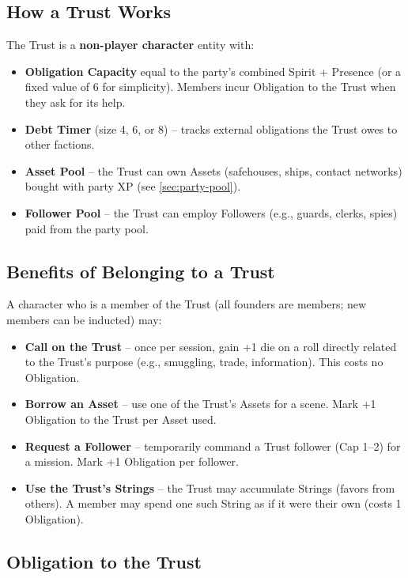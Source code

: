 \subsection{How a Trust Works}
\label{subsec:trust-mechanics}

The Trust is a \textbf{non-player character} entity with:

\begin{itemize}
  \item \textbf{Obligation Capacity} equal to the party's combined Spirit + Presence (or a fixed value of 6 for simplicity). Members incur Obligation to the Trust when they ask for its help.
  \item \textbf{Debt Timer} (size 4, 6, or 8) -- tracks external obligations the Trust owes to other factions.
  \item \textbf{Asset Pool} -- the Trust can own Assets (safehouses, ships, contact networks) bought with party XP (see \ref{sec:party-pool}).
  \item \textbf{Follower Pool} -- the Trust can employ Followers (e.g., guards, clerks, spies) paid from the party pool.
\end{itemize}

\subsection{Benefits of Belonging to a Trust}
\label{subsec:trust-benefits}

A character who is a member of the Trust (all founders are members; new members can be inducted) may:

\begin{itemize}
  \item \textbf{Call on the Trust} -- once per session, gain +1 die on a roll directly related to the Trust's purpose (e.g., smuggling, trade, information). This costs no Obligation.
  \item \textbf{Borrow an Asset} -- use one of the Trust's Assets for a scene. Mark +1 Obligation to the Trust per Asset used.
  \item \textbf{Request a Follower} -- temporarily command a Trust follower (Cap 1--2) for a mission. Mark +1 Obligation per follower.
  \item \textbf{Use the Trust's Strings} -- the Trust may accumulate Strings (favors from others). A member may spend one such String as if it were their own (costs 1 Obligation).
\end{itemize}

\subsection{Obligation to the Trust}
\label{subsec:trust-obligation}

